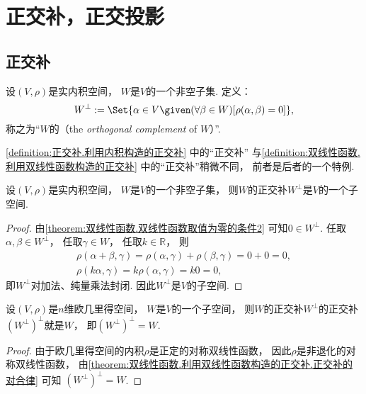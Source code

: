 \section{正交补，正交投影}
\subsection{正交补}
\begin{definition}\label{definition:正交补.利用内积构造的正交补}
设\((V,\rho)\)是实内积空间，
\(W\)是\(V\)的一个非空子集.
定义：\begin{equation*}
	W^\perp
	\defeq
	\Set{
		\alpha \in V
		\given
		(\forall \beta \in W)
		[\rho(\alpha,\beta) = 0]
	},
\end{equation*}
称之为“\(W\)的（the \emph{orthogonal complement} of \(W\)）”.
\end{definition}
\begin{remark}
\cref{definition:正交补.利用内积构造的正交补} 中的“正交补”
与\cref{definition:双线性函数.利用双线性函数构造的正交补} 中的“正交补”稍微不同，
前者是后者的一个特例.
\end{remark}

\begin{property}
设\((V,\rho)\)是实内积空间，
\(W\)是\(V\)的一个非空子集，
则\(W\)的正交补\(W^\perp\)是\(V\)的一个子空间.
\begin{proof}
由\cref{theorem:双线性函数.双线性函数取值为零的条件2} 可知\(0 \in W^\perp\).
任取\(\alpha,\beta \in W^\perp\)，
任取\(\gamma \in W\)，
任取\(k \in \mathbb{R}\)，
则\begin{gather*}
	\rho(\alpha+\beta,\gamma)
	= \rho(\alpha,\gamma) + \rho(\beta,\gamma)
	= 0 + 0 = 0, \\
	\rho(k\alpha,\gamma)
	= k\rho(\alpha,\gamma)
	= k0 = 0,
\end{gather*}
即\(W^\perp\)对加法、纯量乘法封闭.
因此\(W^\perp\)是\(V\)的子空间.
\end{proof}
\end{property}

\begin{property}\label{theorem:正交补.利用内积构造的正交补.正交补的对合律}
设\((V,\rho)\)是\(n\)维欧几里得空间，
\(W\)是\(V\)的一个子空间，
则\(W\)的正交补\(W^\perp\)的正交补\((W^\perp)^\perp\)就是\(W\)，
即\((W^\perp)^\perp = W\).
\begin{proof}
由于欧几里得空间的内积\(\rho\)是正定的对称双线性函数，
因此\(\rho\)是非退化的对称双线性函数，
由\cref{theorem:双线性函数.利用双线性函数构造的正交补.正交补的对合律} 可知
\((W^\perp)^\perp = W\).
\end{proof}
\end{property}

